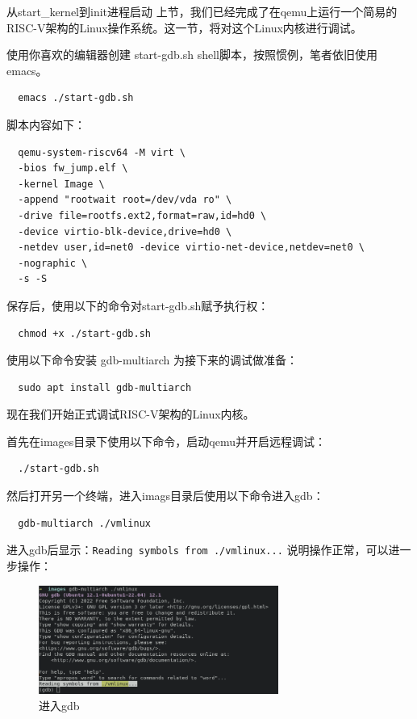 \documentclass[lang=cn,10pt]{elegantbook}
\begin{document}
从start\_kernel到init进程启动
上节，我们已经完成了在qemu上运行一个简易的RISC-V架构的Linux操作系统。这一节，将对这个Linux内核进行调试。

使用你喜欢的编辑器创建 start-gdb.sh shell脚本，按照惯例，笔者依旧使用emacs。

\begin{lstlisting}
  emacs ./start-gdb.sh
\end{lstlisting}
脚本内容如下：

\begin{lstlisting}
  qemu-system-riscv64 -M virt \
  -bios fw_jump.elf \
  -kernel Image \
  -append "rootwait root=/dev/vda ro" \
  -drive file=rootfs.ext2,format=raw,id=hd0 \
  -device virtio-blk-device,drive=hd0 \
  -netdev user,id=net0 -device virtio-net-device,netdev=net0 \
  -nographic \
  -s -S
\end{lstlisting}
保存后，使用以下的命令对start-gdb.sh赋予执行权：

\begin{lstlisting}
  chmod +x ./start-gdb.sh
\end{lstlisting}

使用以下命令安装 gdb-multiarch 为接下来的调试做准备：
\begin{lstlisting}
  sudo apt install gdb-multiarch
\end{lstlisting}

现在我们开始正式调试RISC-V架构的Linux内核。

首先在images目录下使用以下命令，启动qemu并开启远程调试：
\begin{lstlisting}
  ./start-gdb.sh
\end{lstlisting}

然后打开另一个终端，进入imags目录后使用以下命令进入gdb：

\begin{lstlisting}
  gdb-multiarch ./vmlinux
\end{lstlisting}

进入gdb后显示：\lstinline{Reading symbols from ./vmlinux...} 说明操作正常，可以进一步操作：

\begin{figure}[htbp]
  \centering
  \includegraphics[width=0.7\textwidth]{image/image-20231105111831194.png}
  \caption{进入gdb}
\end{figure}
\end{document}
